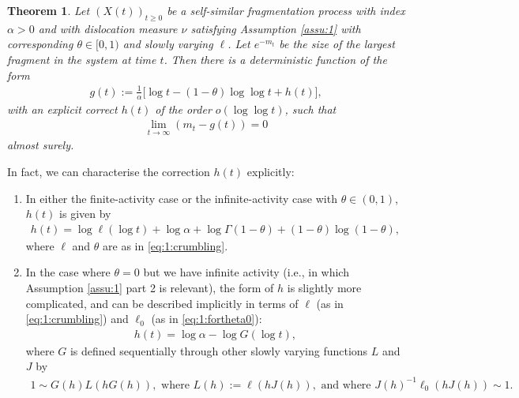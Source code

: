 \documentclass[a4,12pt]{amsart}
\numberwithin{equation}{section}
\newtheorem{thmalpha}{Theorem}
\begin{document}
    \begin{thmalpha} \label{thm:ia}
    	Let $(X(t))_{t\geq 0}$ be a self-similar fragmentation process with index $\alpha >0$ and with 
    	dislocation measure $\nu$ satisfying Assumption \ref{assu:1} with corresponding $\theta\in[0,1)$ and slowly varying $\ell$. 
    	Let $e^{ -m_t}$ be the size of the largest fragment in the system at time $t$. Then there is a deterministic function of the form
    	\begin{align} \label{eq:ia}
    	   g(t) := \frac{1}{\alpha} 
    		\big[  \log t - (1-\theta) \log \log t 
    		+ h(t) \big],
    	\end{align}
        with an explicit correct $h(t)$ of the order $ o(\log \log t)$,
        such that
    	\begin{align*}
    		\lim_{t \to \infty}(m_t-g(t)) = 0
    	\end{align*}
    	almost surely.
	\end{thmalpha}


    In fact, we can characterise the correction $h(t)$ explicitly:
    \begin{enumerate}
        \item In either the finite-activity case or the infinite-activity case with $\theta \in (0,1)$, $h(t)$ is given by 
        \begin{align*}
            h(t) = \log \ell( \log t) + \log \alpha + \log \Gamma(1-\theta) + (1-\theta)\log(1-\theta),    
        \end{align*}
        where $\ell$ and $\theta$ are as in \eqref{eq:1:crumbling}. 

        \item In the case where $\theta = 0$ but we have infinite activity (i.e., in which Assumption \ref{assu:1} part 2 is relevant), the form of $h$ is slightly more complicated, and can be described implicitly in terms of $\ell$ (as in \eqref{eq:1:crumbling}) and $\ell_0$ (as in \eqref{eq:1:fortheta0}):
        \begin{align*}
            h(t) = \log \alpha - \log G(\log t),
        \end{align*}
        where $G$ is defined sequentially through other slowly varying functions $L$ and $J$ by 
        \begin{align} \label{eq:complicated0}
            1 \sim G(h)L(hG(h)), \text{ where } L(h) := \ell(hJ(h)), \text{ and where } J(h)^{-1}\ell_0(hJ(h)) \sim 1.
        \end{align}
    \end{enumerate}
\end{document}
